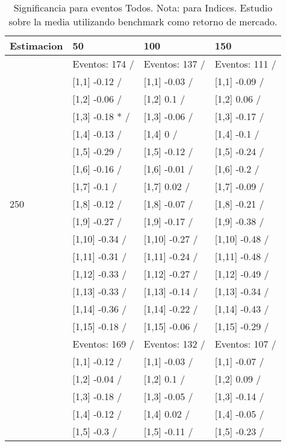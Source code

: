 \begin{table}

\caption{Significancia para eventos Todos. Nota: para Indices. Estudio sobre la media utilizando benchmark como retorno de mercado.}
\centering
\begin{tabular}[t]{llll}
\toprule
Estimacion & 50 & 100 & 150\\
\midrule
 & Eventos:  174 / & Eventos:  137 / & Eventos:  111 /\\
 & {}[1,1] -0.12  / & {}[1,1] -0.03  / & {}[1,1] -0.09  /\\
 & {}[1,2] -0.06  / & {}[1,2] 0.1  / & {}[1,2] 0.06  /\\
 & {}[1,3] -0.18 * / & {}[1,3] -0.06  / & {}[1,3] -0.17  /\\
 & {}[1,4] -0.13  / & {}[1,4] 0  / & {}[1,4] -0.1  /\\
\addlinespace
 & {}[1,5] -0.29  / & {}[1,5] -0.12  / & {}[1,5] -0.24  /\\
 & {}[1,6] -0.16  / & {}[1,6] -0.01  / & {}[1,6] -0.2  /\\
 & {}[1,7] -0.1  / & {}[1,7] 0.02  / & {}[1,7] -0.09  /\\
250 & {}[1,8] -0.12  / & {}[1,8] -0.07  / & {}[1,8] -0.21  /\\
 & {}[1,9] -0.27  / & {}[1,9] -0.17  / & {}[1,9] -0.38  /\\
\addlinespace
 & {}[1,10] -0.34  / & {}[1,10] -0.27  / & {}[1,10] -0.48  /\\
 & {}[1,11] -0.31  / & {}[1,11] -0.24  / & {}[1,11] -0.48  /\\
 & {}[1,12] -0.33  / & {}[1,12] -0.27  / & {}[1,12] -0.49  /\\
 & {}[1,13] -0.33  / & {}[1,13] -0.14  / & {}[1,13] -0.34  /\\
 & {}[1,14] -0.36  / & {}[1,14] -0.22  / & {}[1,14] -0.43  /\\
\addlinespace
 & {}[1,15] -0.18  / & {}[1,15] -0.06  / & {}[1,15] -0.29  /\\
 & Eventos:  169 / & Eventos:  132 / & Eventos:  107 /\\
 & {}[1,1] -0.12  / & {}[1,1] -0.03  / & {}[1,1] -0.07  /\\
 & {}[1,2] -0.04  / & {}[1,2] 0.1  / & {}[1,2] 0.09  /\\
 & {}[1,3] -0.18  / & {}[1,3] -0.05  / & {}[1,3] -0.14  /\\
\addlinespace
 & {}[1,4] -0.12  / & {}[1,4] 0.02  / & {}[1,4] -0.05  /\\
 & {}[1,5] -0.3  / & {}[1,5] -0.11  / & {}[1,5] -0.23  /\\

\end{tabular}
\end{table}
